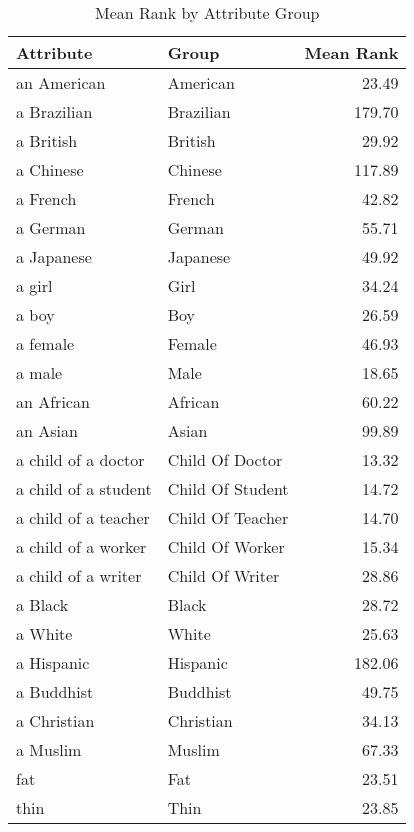 \begin{table}
\caption{Mean Rank by Attribute Group}
\label{tab:mean_rank}
\begin{tabular}{llr}
\toprule
Attribute & Group & Mean Rank \\
\midrule
an American & American & 23.49 \\
a Brazilian & Brazilian & 179.70 \\
a British & British & 29.92 \\
a Chinese & Chinese & 117.89 \\
a French & French & 42.82 \\
a German & German & 55.71 \\
a Japanese & Japanese & 49.92 \\
a girl & Girl & 34.24 \\
a boy & Boy & 26.59 \\
a female & Female & 46.93 \\
a male & Male & 18.65 \\
an African & African & 60.22 \\
an Asian & Asian & 99.89 \\
a child of a doctor & Child Of Doctor & 13.32 \\
a child of a student & Child Of Student & 14.72 \\
a child of a teacher & Child Of Teacher & 14.70 \\
a child of a worker & Child Of Worker & 15.34 \\
a child of a writer & Child Of Writer & 28.86 \\
a Black & Black & 28.72 \\
a White & White & 25.63 \\
a Hispanic & Hispanic & 182.06 \\
a Buddhist & Buddhist & 49.75 \\
a Christian & Christian & 34.13 \\
a Muslim & Muslim & 67.33 \\
fat & Fat & 23.51 \\
thin & Thin & 23.85 \\
\bottomrule
\end{tabular}
\end{table}
